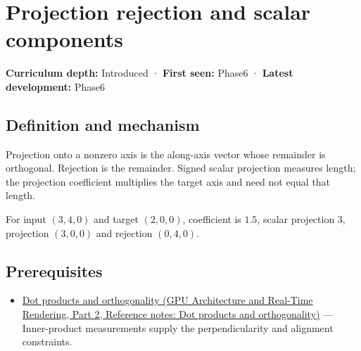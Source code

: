 \hypertarget{appendix-505a502c372a}{}\label{referencestart:appendix-505a502c372a}
\section{Projection rejection and scalar components}\label{appendix-505a502c372a-projection-rejection-and-scalar-components}

\hypertarget{appendix-505a502c372a-projection-rejection-and-scalar-components}{}

\textbf{Curriculum depth:} Introduced · \textbf{First seen:} Phase6 · \textbf{Latest development:} Phase6

\begin{allmightroledefinition}

\subsection{Definition and mechanism}\label{appendix-505a502c372a-definition-and-mechanism}

\hypertarget{appendix-505a502c372a-definition-and-mechanism}{}

Projection onto a nonzero axis is the along-axis vector whose remainder is orthogonal. Rejection is the remainder. Signed scalar projection measures length; the projection coefficient multiplies the target axis and need not equal that length.

\end{allmightroledefinition}

For input \((3,4,0)\) and target \((2,0,0)\), coefficient is \(1.5\), scalar projection \(3\), projection \((3,0,0)\) and rejection \((0,4,0)\).

\subsection{Prerequisites}\label{appendix-505a502c372a-prerequisites}

\hypertarget{appendix-505a502c372a-prerequisites}{}

\begin{itemize}
\tightlist
\item
  \href{../06-GPU-Architecture-and-Real-Time-Rendering-P02/main.pdf\#nameddest=appendix-8bc4e8fc547c}{Dot products and orthogonality (GPU Architecture and Real-Time Rendering, Part 2, Reference notes: Dot products and orthogonality)} --- Inner-product measurements supply the perpendicularity and alignment constraints.
\end{itemize}

